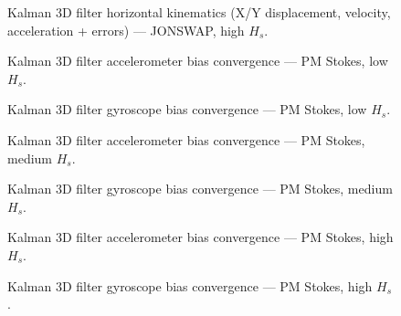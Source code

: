 \documentclass[11pt,letterpaper]{article}
\begin{document}
\begin{figure}[H]\centering
  \resizebox{\textwidth}{!}{}
  \caption{Kalman 3D filter horizontal kinematics (X/Y displacement, velocity, acceleration + errors) — JONSWAP, high $H_s$.}
  \label{fig:w3d_jonswap_high_xykin}
\end{figure}


\begin{figure}[H]\centering
  \resizebox{\textwidth}{!}{}
  \caption{Kalman 3D filter accelerometer bias convergence — PM Stokes, low $H_s$.}
  \label{fig:w3d_pmstokes_low_acc_bias}
\end{figure}

\begin{figure}[H]\centering
  \resizebox{\textwidth}{!}{}
  \caption{Kalman 3D filter gyroscope bias convergence — PM Stokes, low $H_s$.}
  \label{fig:w3d_pmstokes_low_gyro_bias}
\end{figure}

\begin{figure}[H]\centering
  \resizebox{\textwidth}{!}{}
  \caption{Kalman 3D filter accelerometer bias convergence — PM Stokes, medium $H_s$.}
  \label{fig:w3d_pmstokes_medium_acc_bias}
\end{figure}

\begin{figure}[H]\centering
  \resizebox{\textwidth}{!}{}
  \caption{Kalman 3D filter gyroscope bias convergence — PM Stokes, medium $H_s$.}
  \label{fig:w3d_pmstokes_medium_gyro_bias}
\end{figure}

\begin{figure}[H]\centering
  \resizebox{\textwidth}{!}{}
  \caption{Kalman 3D filter accelerometer bias convergence — PM Stokes, high $H_s$.}
  \label{fig:w3d_pmstokes_high_acc_bias}
\end{figure}

\begin{figure}[H]\centering
  \resizebox{\textwidth}{!}{}
  \caption{Kalman 3D filter gyroscope bias convergence — PM Stokes, high $H_s$.}
  \label{fig:w3d_pmstokes_high_gyro_bias}
\end{figure}
\end{document}
